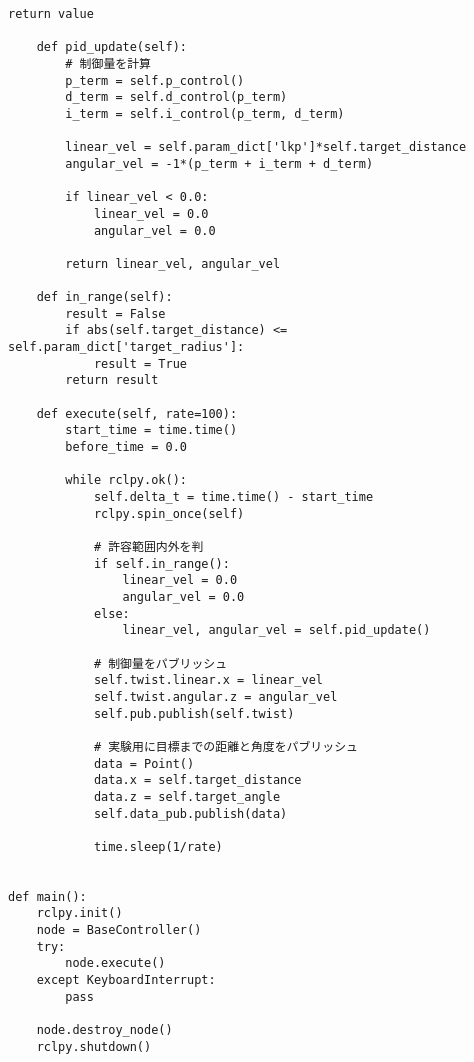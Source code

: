 \begin{lstlisting}[caption=base\_controller.py, label=base]
        return value

    def pid_update(self):
        # 制御量を計算
        p_term = self.p_control()
        d_term = self.d_control(p_term)
        i_term = self.i_control(p_term, d_term)

        linear_vel = self.param_dict['lkp']*self.target_distance
        angular_vel = -1*(p_term + i_term + d_term)

        if linear_vel < 0.0:
            linear_vel = 0.0
            angular_vel = 0.0

        return linear_vel, angular_vel

    def in_range(self):
        result = False
        if abs(self.target_distance) <= self.param_dict['target_radius']:
            result = True
        return result

    def execute(self, rate=100):
        start_time = time.time()
        before_time = 0.0

        while rclpy.ok():
            self.delta_t = time.time() - start_time
            rclpy.spin_once(self)

            # 許容範囲内外を判
            if self.in_range():
                linear_vel = 0.0
                angular_vel = 0.0
            else:
                linear_vel, angular_vel = self.pid_update()

            # 制御量をパブリッシュ
            self.twist.linear.x = linear_vel
            self.twist.angular.z = angular_vel
            self.pub.publish(self.twist)

            # 実験用に目標までの距離と角度をパブリッシュ
            data = Point()
            data.x = self.target_distance
            data.z = self.target_angle
            self.data_pub.publish(data)

            time.sleep(1/rate)


def main():
    rclpy.init()
    node = BaseController()
    try:
        node.execute()
    except KeyboardInterrupt:
        pass

    node.destroy_node()
    rclpy.shutdown()
\end{lstlisting}

